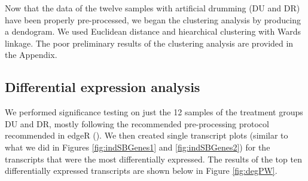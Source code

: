 \documentclass[11pt,a4paper,oldfontcommands,openany]{memoir}
\numberwithin{equation}{section} %
\begin{document}
Now that the data of the twelve samples with artificial drumming (DU and DR) have been properly pre-processed, we began the clustering analysis by producing a dendogram. We used Euclidean distance and hiearchical clustering with Wards linkage. The poor preliminary results of the clustering analysis are provided in the Appendix.

\subsection{Differential expression analysis}

We performed significance testing on just the 12 samples of the treatment groups DU and DR, mostly following the recommended pre-processing protocol recommended in edgeR (\citealt{edger}). We then created single transcript plots (similar to what we did in Figures \ref{fig:indSBGenes1} and \ref{fig:indSBGenes2}) for the transcripts that were the most differentially expressed. The results of the top ten differentially expressed transcripts are shown below in Figure \ref{fig:degPW}.
\end{document}
